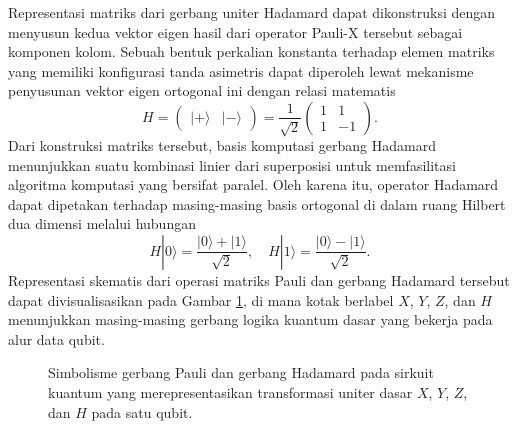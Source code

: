 Representasi matriks dari gerbang uniter Hadamard dapat dikonstruksi dengan menyusun kedua vektor eigen hasil dari operator Pauli-X tersebut sebagai komponen kolom. Sebuah bentuk perkalian konstanta terhadap elemen matriks yang memiliki konfigurasi tanda asimetris dapat diperoleh lewat mekanisme penyusunan vektor eigen ortogonal ini dengan relasi matematis
\begin{equation}
\label{eq:matriks_hadamard}
H = \begin{pmatrix} |+\rangle & |-\rangle \end{pmatrix} = \frac{1}{\sqrt{2}} \begin{pmatrix} 1 & 1 \\ 1 & -1 \end{pmatrix}.
\end{equation}
Dari konstruksi matriks tersebut, basis komputasi gerbang Hadamard menunjukkan suatu kombinasi linier dari superposisi untuk memfasilitasi algoritma komputasi yang bersifat paralel. Oleh karena itu, operator Hadamard dapat dipetakan terhadap masing-masing basis ortogonal di dalam ruang Hilbert dua dimensi melalui hubungan
\begin{equation}
\label{eq:aksi_hadamard}
H|0\rangle = \frac{|0\rangle + |1\rangle}{\sqrt{2}}, \quad H|1\rangle = \frac{|0\rangle - |1\rangle}{\sqrt{2}}.
\end{equation}
Representasi skematis dari operasi matriks Pauli dan gerbang Hadamard tersebut dapat divisualisasikan pada Gambar \ref{fig:gerbang_pauli}, di mana kotak berlabel $X$, $Y$, $Z$, dan $H$ menunjukkan masing-masing gerbang logika kuantum dasar yang bekerja pada alur data qubit.
\begin{figure}[htbp]
    \centering
    \caption{Simbolisme gerbang Pauli dan gerbang Hadamard pada sirkuit kuantum yang merepresentasikan transformasi uniter dasar $X$, $Y$, $Z$, dan $H$ pada satu qubit.}
    \label{fig:gerbang_pauli}
\end{figure}

